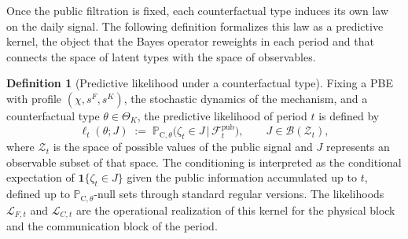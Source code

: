 \documentclass[pdflatex,sn-mathphys-ay]{sn-jnl}
\theoremstyle{plain}
\theoremstyle{definition}
\newtheorem{definition}[theorem]{Definition}
\newcommand{\ProbC}[1]{\mathbb{P}_{\mathrm{C},#1}}
\newcommand{\ThetaK}{\Theta_K}
\newcommand{\1}{\mathbf{1}}
\begin{document}
Once the public filtration is fixed, each counterfactual type induces its own law on the daily signal. The following definition formalizes this law as a predictive kernel, the object that the Bayes operator reweights in each period and that connects the space of latent types with the space of observables.

\begin{definition}[Predictive likelihood under a counterfactual type]\label{def:predictive-likelihood}
Fixing a PBE with profile $(\chi,s^F,s^K)$, the stochastic dynamics of the mechanism, and a counterfactual type $\theta\in\ThetaK$, the predictive likelihood of period $t$ is defined by
\begin{equation}
\label{eq:likelihood-zeta}
\ell_t(\theta;J)\;:=\;\ProbC{\theta}\bigl(\zeta_t \in J \,\big|\, \mathcal{F}_t^{\mathrm{pub}}\bigr),
\qquad J\in\mathcal{B}(\mathcal{Z}_t),
\end{equation}
where $\mathcal{Z}_t$ is the space of possible values of the public signal and $J$ represents an observable subset of that space. The conditioning is interpreted as the conditional expectation of $\mathbf{1}\{\zeta_t\in J\}$ given the public information accumulated up to $t$, defined up to $\ProbC{\theta}$-null sets through standard regular versions. The likelihoods $\mathcal{L}_{F,t}$ and $\mathcal{L}_{C,t}$ are the operational realization of this kernel for the physical block and the communication block of the period.
\end{definition}
\end{document}
